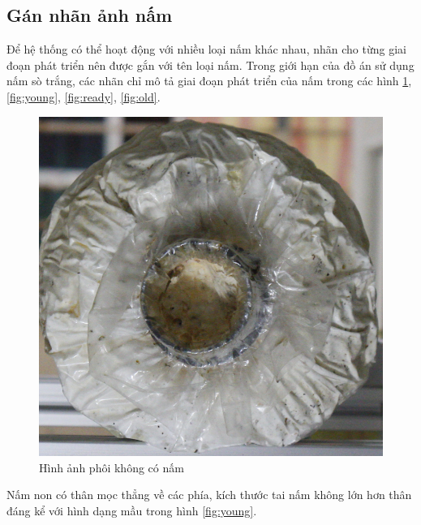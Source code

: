 \subsection{Gán nhãn ảnh nấm}

Để hệ thống có thể hoạt động với nhiều loại nấm khác nhau, nhãn cho từng giai đoạn phát triển nên được gắn với tên loại nấm. Trong giới hạn của đồ án sử dụng nấm sò trắng, các nhãn chỉ mô tả giai đoạn phát triển của nấm trong các hình \ref{fig:empty}, \ref{fig:young}, \ref{fig:ready}, \ref{fig:old}.

\begin{figure}[h]
	\centering
	\includegraphics[width=0.4\linewidth]{images/empty}
	\caption{Hình ảnh phôi không có nấm}
	\label{fig:empty}
\end{figure}


Nấm non có thân mọc thẳng về các phía, kích thước tai nấm không lớn hơn thân đáng kể với hình dạng mầu trong hình \ref{fig:young}.

